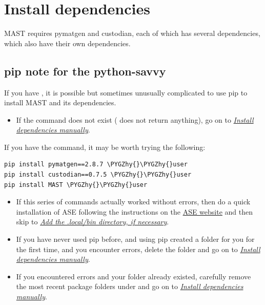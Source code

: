 \documentclass[letterpaper,10pt,english]{sphinxmanual}
\def\PYGZhy{\char`\-}
\begin{document}
\section{Install dependencies}
\label{1_0_installation:install-dependencies}
MAST requires pymatgen and custodian, each of which has several dependencies, which also have their own dependencies.


\subsection{pip note for the python-savvy}
\label{1_0_installation:pip-note-for-the-python-savvy}
If you have , it is possible but sometimes unusually complicated to use pip to install MAST and its dependencies.
\begin{itemize}
\item {} 
If the  command does not exist ( does not return anything), go on to {\hyperref[1_0_installation:manual-installation]{\emph{Install dependencies manually}}}.

\end{itemize}

If you have the  command, it may be worth trying the following:

\begin{Verbatim}[commandchars=\\\{\}]
pip install pymatgen==2.8.7 \PYGZhy{}\PYGZhy{}user
pip install custodian==0.7.5 \PYGZhy{}\PYGZhy{}user
pip install MAST \PYGZhy{}\PYGZhy{}user
\end{Verbatim}
\begin{itemize}
\item {} 
If this series of commands actually worked without errors, then do a quick installation of ASE following the instructions on the \href{https://wiki.fysik.dtu.dk/ase/download.html}{ASE website} and then skip to {\hyperref[1_0_installation:add-local-bin]{\emph{Add the .local/bin directory, if necessary}}}.

\item {} 
If you have never used pip before, and using pip created a  folder for you for the first time, and you encounter errors, delete the  folder and go on to {\hyperref[1_0_installation:manual-installation]{\emph{Install dependencies manually}}}.

\item {} 
If you encountered errors and your  folder already existed, carefully remove the most recent package folders under  and go on to {\hyperref[1_0_installation:manual-installation]{\emph{Install dependencies manually}}}.

\end{itemize}
\end{document}
